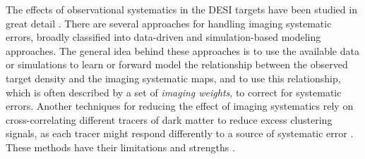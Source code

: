 The effects of observational systematics in the DESI targets have been studied in great detail \cite[see, e.g.,][]{kitanidis2020imaging, zhou2021clustering, chaussidon2022angular}. There are several approaches for handling imaging systematic errors, broadly classified into data-driven and simulation-based modeling approaches. The general idea behind these approaches is to use the available data or simulations to learn or forward model the relationship between the observed target density and the imaging systematic maps, and to use this relationship, which is often described by a set of \textit{imaging weights}, to correct for systematic errors. Another techniques for reducing the effect of imaging systematics rely on cross-correlating different tracers of dark matter to reduce excess clustering signals, as each tracer might respond differently to a source of systematic error \citep[see, e.g.,][]{giannantonio2014improved}. These methods have their limitations and strengths \citep[see, e.g.,][for a review]{2021MNRAS.503.5061W}.

